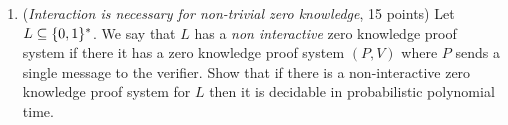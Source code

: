\documentclass{article}
\begin{document}
\begin{enumerate}[,start=3]
\item{}
(\emph{Interaction  is necessary for non-trivial zero knowledge}, 15 points)
Let $L \subseteq \{0,1\}^*$. We say that $L$ has a \emph{non interactive} zero knowledge proof system if there it has a zero knowledge proof system $(P,V)$ where $P$ sends a single message to the verifier. Show that if there is a non-interactive zero knowledge proof system for $L$ then it is decidable in probabilistic polynomial time.%


\end{enumerate}
\end{document}
